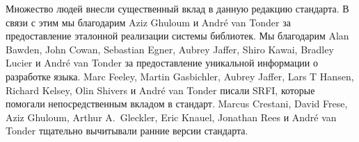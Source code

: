 Множество людей внесли существенный вклад в данную редакцию стандарта. В связи с этим мы
благодарим Aziz Ghuloum и Andr\'e van Tonder за предоставление эталонной реализации системы
библиотек. Мы благодарим Alan Bawden, John Cowan, Sebastian Egner, Aubrey Jaffer, Shiro Kawai,
Bradley Lucier и Andr\'e van Tonder за предоставление уникальной информации о разработке языка.
Marc Feeley, Martin Gasbichler, Aubrey Jaffer, Lars T Hansen, Richard Kelsey, Olin Shivers и
Andr\'e van Tonder писали SRFI, которые помогали непосредственным вкладом в стандарт. Marcus
Crestani, David Frese, Aziz Ghuloum, Arthur A.\ Gleckler, Eric Knauel, Jonathan Rees и Andr\'e
van Tonder тщательно вычитывали ранние версии стандарта.\vspace{4mm}

